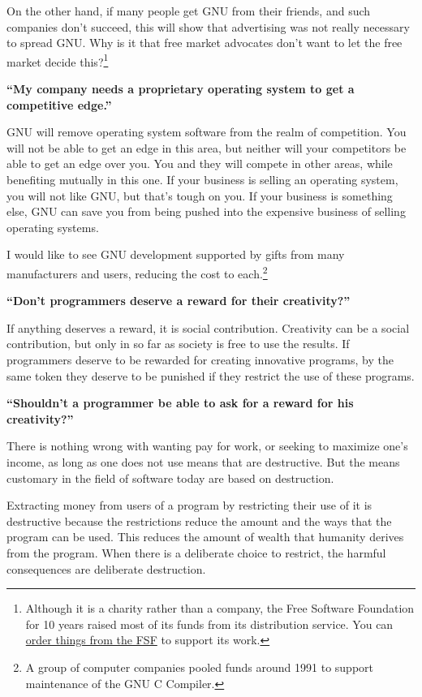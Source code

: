 On the other hand, if many people get GNU from their friends, and such companies don't succeed, this will show that advertising was not really necessary to spread GNU. Why is it that free market advocates don't want to let the free market decide this?\footnote{Although it is a charity rather than a company, the Free Software Foundation for 10 years raised most of its funds from its distribution service. You can \href{http://www.gnu.org/order/order.html}{order things from the FSF} to support its work. }\par
\textbf{“My company needs a proprietary operating system to get a competitive edge.”}\par
GNU will remove operating system software from the realm of competition. You will not be able to get an edge in this area, but neither will your competitors be able to get an edge over you. You and they will compete in other areas, while benefiting mutually in this one. If your business is selling an operating system, you will not like GNU, but that's tough on you. If your business is something else, GNU can save you from being pushed into the expensive business of selling operating systems.\par
I would like to see GNU development supported by gifts from many manufacturers and users, reducing the cost to each.\footnote{A group of computer companies pooled funds around 1991 to support maintenance of the GNU C Compiler.}\par
\textbf{“Don't programmers deserve a reward for their creativity?”}\par
If anything deserves a reward, it is social contribution. Creativity can be a social contribution, but only in so far as society is free to use the results. If programmers deserve to be rewarded for creating innovative programs, by the same token they deserve to be punished if they restrict the use of these programs.\par
\textbf{“Shouldn't a programmer be able to ask for a reward for his creativity?”}\par
There is nothing wrong with wanting pay for work, or seeking to maximize one's income, as long as one does not use means that are destructive. But the means customary in the field of software today are based on destruction.\par
Extracting money from users of a program by restricting their use of it is destructive because the restrictions reduce the amount and the ways that the program can be used. This reduces the amount of wealth that humanity derives from the program. When there is a deliberate choice to restrict, the harmful consequences are deliberate destruction.\par
